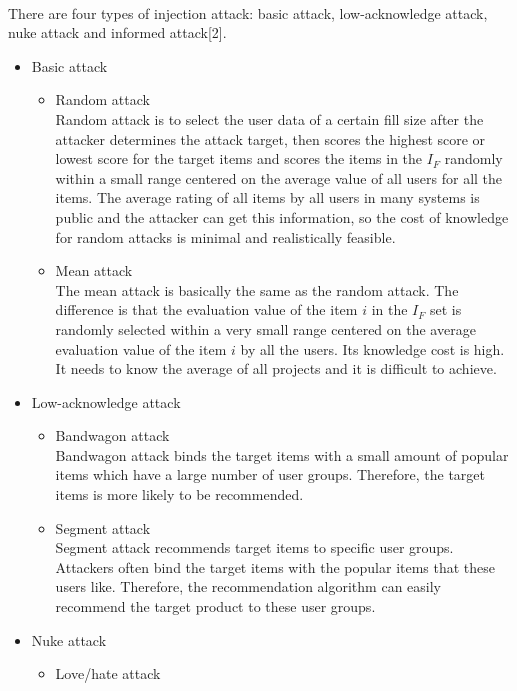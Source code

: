 \documentclass[a4paper, 12pt]{article}
\theoremstyle{definition}
\begin{document}
\paragraph{}There are four types of injection attack: basic attack, low-acknowledge attack, nuke attack and informed attack[2].
\begin{itemize}
	\item Basic attack
	\begin{itemize}
		\item Random attack\\
		Random attack is to select the user data of a certain fill size after the attacker determines the attack target, then scores the highest score or lowest score for the target items and scores the items in the $I_F$ randomly within a small range centered on the average value of all users for all the items. The average rating of all items by all users in many systems is public and the attacker can get this information, so the cost of knowledge for random attacks is minimal and realistically feasible.
		\item Mean attack\\
		The mean attack is basically the same as the random attack. The  difference is that the evaluation value of the item $i$ in the $I_F$ set is randomly selected within a very small range centered on the average evaluation value of the item $i$ by all the users. Its knowledge cost is high. It needs to know the average of all projects and it is difficult to achieve.
	\end{itemize}
	\item Low-acknowledge attack
	\begin{itemize}
		\item Bandwagon attack\\
		Bandwagon attack binds the target items with a small amount of popular items which have a large number of user groups. Therefore, the target items is more likely to be recommended.
		\item Segment attack\\
		Segment attack recommends target items to specific user groups. Attackers often bind the target items with the popular items that these users like. Therefore, the recommendation algorithm can easily recommend the target product to these user groups.
	\end{itemize}
	\item Nuke attack
	\begin{itemize}
		\item Love/hate attack\\

\end{itemize}
\end{itemize}
\end{document}
